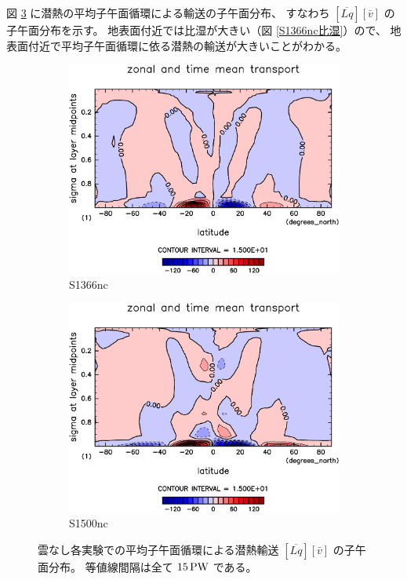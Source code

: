 \documentclass[body]{subfiles}
\begin{document}
図 \ref{潜熱平均子午面循環nc} に潜熱の平均子午面循環による輸送の子午面分布、
すなわち \([\overline{Lq}][\bar v]\) の子午面分布を示す。
地表面付近では比湿が大きい（図 \ref{S1366nc比湿}）ので、
地表面付近で平均子午面循環に依る潜熱の輸送が大きいことがわかる。

\afterpage{\clearpage}

\begin{figure}[t]
	\centering
	\begin{subfigure}{.4\textwidth}
		\centering
		\includegraphics[width=\textwidth]{S1366-nc/MeriHeatTransTest@latentEn_M,time=3650:4015-crop-rotate.pdf}
		\caption{S1366nc}\label{潜熱平均子午面循環S1366nc}
	\end{subfigure}
	\begin{subfigure}{.4\textwidth}
		\centering
		\includegraphics[width=\textwidth]{S1500-nc/MeriHeatTransTest@latentEn_M,time=3650:4015-crop-rotate.pdf}
		\caption{S1500nc}\label{潜熱平均子午面循環S1500nc}
	\end{subfigure}
	\caption[雲なし各実験での平均子午面循環による潜熱輸送の子午面分布]{
		雲なし各実験での平均子午面循環による潜熱輸送 \([\overline{Lq}][\bar v]\) の子午面分布。
		等値線間隔は全て \(15\hmu{PW}\) である。
	}\label{潜熱平均子午面循環nc}
\end{figure}
\end{document}
